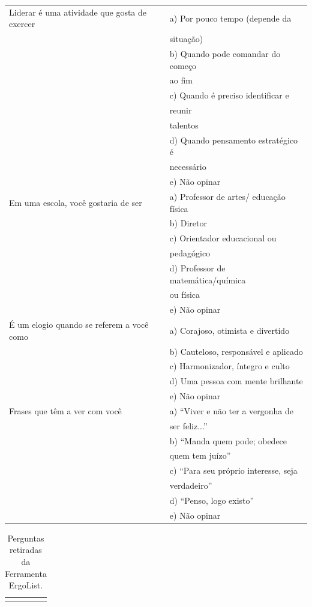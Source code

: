 \documentclass[
	12pt,				%
    oneside,			%
	a4paper,			%
	english,			%
	french,				%
	spanish,			%
	brazil,				%
	]{abntex2}
\begin{document}
\begin{apendicesenv}
\begin{center}
\begin{longtable}{l|l}
    Liderar é uma atividade que gosta de exercer & a) Por pouco tempo (depende da \\ & situação)\\ & b) Quando pode comandar do começo \\ & ao fim\\ & c) Quando é preciso identificar e \\ & reunir\\ & talentos\\ & d) Quando pensamento estratégico é\\ & necessário\\ & e) Não opinar
    \\ \hline
    Em uma escola, você gostaria de ser & a) Professor de artes/ educação física\\ & b) Diretor\\ & c) Orientador educacional ou \\ & pedagógico\\ & d) Professor de matemática/química \\ & ou física\\ & e) Não opinar
    \\ \hline
    É um elogio quando se referem a você como & a) Corajoso, otimista e divertido\\ & b) Cauteloso, responsável e aplicado\\ & c) Harmonizador, íntegro e culto\\ & d) Uma pessoa com mente brilhante\\ & e) Não opinar
    \\ \hline
    Frases que têm a ver com você & a) “Viver e não ter a vergonha de \\ & ser feliz...”\\ & b) “Manda quem pode; obedece \\ & quem tem juízo”\\ & c) “Para seu próprio interesse, seja\\ & verdadeiro”\\ & d) “Penso, logo existo”\\ & e) Não opinar
    \\ \hline
\end{longtable}
\end{center}



\begin{center}
\begin{longtable}{l|l}
\caption{Perguntas retiradas da Ferramenta ErgoList.} 
\label{tab:ErgoList}
\columnsep=5cm


\end{longtable}
\end{center}
\end{apendicesenv}
\end{document}
